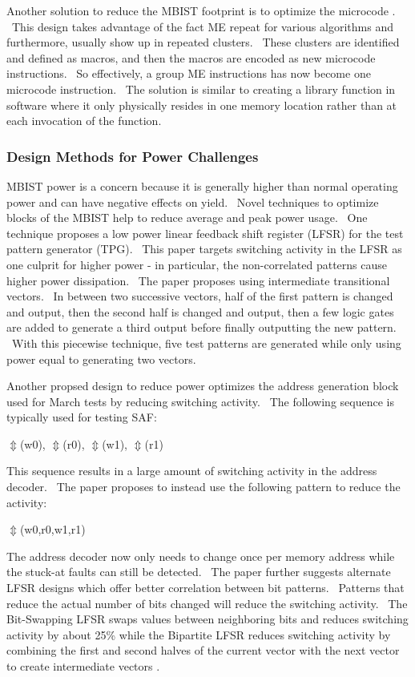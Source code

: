 Another solution to reduce the MBIST footprint is to optimize the microcode \cite{5692281}.  This design takes advantage of the fact ME repeat for various algorithms and furthermore, usually show up in repeated clusters.  These clusters are identified and defined as macros, and then the macros are encoded as new microcode instructions.  So effectively, a group ME instructions has now become one microcode instruction.  The solution is similar to creating a library function in software where it only physically resides in one memory location rather than at each invocation of the function.  

\subsubsection{Design Methods for Power Challenges}
MBIST power is a concern because it is generally higher than normal operating power and can have negative effects on yield.  Novel techniques to optimize blocks of the MBIST help to reduce average and peak power usage.  One technique \cite{NovelBist} proposes a low power linear feedback shift register (LFSR) for the test pattern generator (TPG).  This paper targets switching activity in the LFSR as one culprit for higher power - in particular, the non-correlated patterns cause higher power dissipation.  The paper proposes using intermediate transitional vectors.  In between two successive vectors, half of the first pattern is changed and output, then the second half is changed and output, then a few logic gates are added to generate a third output before finally outputting the new pattern.  With this piecewise technique, five test patterns are generated while only using power equal to generating two vectors.

Another propsed design to reduce power optimizes the address generation block used for March tests by reducing switching activity.  The following sequence is typically used for testing SAF:
\newline
\centerline{$\Updownarrow$(w0), $\Updownarrow$(r0), $\Updownarrow$(w1), $\Updownarrow$(r1)}
\newline
This sequence results in a large amount of switching activity in the address decoder.  The paper proposes to instead use the following pattern to reduce the activity:
\newline
\centerline{ $\Updownarrow$(w0,r0,w1,r1)}
\newline
The address decoder now only needs to change once per memory address while the stuck-at faults can still be detected.  The paper further suggests alternate LFSR designs which offer better correlation between bit patterns.  Patterns that reduce the actual number of bits changed will reduce the switching activity.  The Bit-Swapping LFSR swaps values between neighboring bits and reduces switching activity by about 25\% \cite{4472405} while the Bipartite LFSR reduces switching activity by combining the first and second halves of the current vector with the next vector to create intermediate vectors \cite{1329365}.



